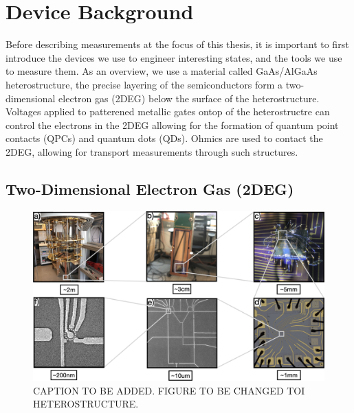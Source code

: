 \chapter{Device Background}\label{cha:device_background}

Before describing measurements at the focus of this thesis, it is important to first introduce the devices we use to engineer interesting states, and the tools we use to measure them. As an overview, we use a material called GaAs/AlGaAs heterostructure, the precise layering of the semiconductors form a two-dimensional electron gas (2DEG) below the surface of the heterostructure. Voltages applied to patterened metallic gates ontop of the heterostructre can control the electrons in the 2DEG allowing for the formation of quantum point contacts (QPCs) and quantum dots  (QDs). Ohmics are used to contact the 2DEG, allowing for transport measurements through such structures. 

\section{Two-Dimensional Electron Gas (2DEG)}



\begin{figure}[ht]
  \begin{center}
    \includegraphics[width=1.0\textwidth]{figures/ch1/crop_PosterFiguresMaster.001.png}
    \caption[Two-dimensional electron gas in a GaAs/AlGaAs heterostructure]{\label{fig:ch1/2deg} 
    CAPTION TO BE ADDED. FIGURE TO BE CHANGED TOI HETEROSTRUCTURE.  
      }
  \end{center}
\end{figure}



